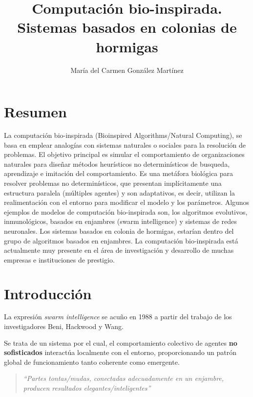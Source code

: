 \documentclass[10pt,a4paper]{article}
\author{María del Carmen González Martínez}
\title{Computación bio-inspirada. Sistemas basados en colonias de hormigas}
\begin{document}
\maketitle

\section*{Resumen} 

La computación bio-inspirada (Bioinspired Algorithms/Natural Computing), se basa en emplear analogías con sistemas naturales o sociales para la resolución de problemas. El objetivo principal es simular el comportamiento de organizaciones naturales para diseñar métodos heurísticos no determinísticos de busqueda, aprendizaje e imitación del comportamiento. 
Es una metáfora biológica para resolver problemas no determinísticos, que presentan implícitamente una estructura paralela (múltiples agentes) y son adaptativos, es decir, utilizan la realimentación con el entorno para modificar el modelo y los parámetros. Algunos ejemplos de modelos de computación bio-inspirada son, los algoritmos evolutivos, inmunológicos, basados en enjambres (swarm intelligence) y sistemas de redes neuronales. Los sistemas basados en colonia de hormigas, estarían dentro del grupo de algoritmos basados en enjambres.
La computación bio-inspirada está actualmente muy presente en el área de investigación y desarrollo de muchas empresas e instituciones de prestigio.

\section{Introducción}
La expresión \emph{swarm intelligence} se acuño en 1988 a partir del trabajo de los investigadores Beni, Hackwood y Wang.

\begin{center}
\end{center}

Se trata de un sistema por el cual, el comportamiento colectivo de agentes \textbf{no sofisticados} interactúa localmente con el entorno, proporcionando un patrón global de funcionamiento tanto coherente como emergente.

\begin{quote}
\textit{``Partes tontas/mudas, conectadas adecuadamente en un enjambre, producen resultados elegantes/inteligentes''}
\end{quote}
\end{document}
